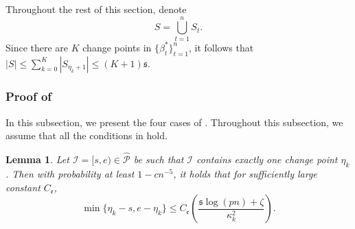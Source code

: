 \documentclass[11pt]{article}
\newcommand{\I}{{\mathcal I }}
\newcommand{\s}{ { \mathfrak{s}  } }
\theoremstyle{plain}
\newtheorem{lemma}[theorem]{Lemma}
\theoremstyle{definition}
\begin{document}
Throughout the rest of this section, denote 
$$S  = \bigcup_{t=1}^n S_t . $$
Since there are $K$ change points in $\{\beta_t^*\}_{t=1}^n$, it follows that $| S| \le \sum_{k=0}^K | S_{\eta_k+1}|\le (K+1) \s $. 


\subsubsection[]{Proof of }
In this subsection, we present the four cases of 
. Throughout this  subsection, we assume that all the conditions in  hold.

 \begin{lemma}
 Let   $ \I=[s,e) \in \mathcal {\widehat P}  $  be such that $\I$ contains exactly  one    change point $ \eta_k $. 
 Then  with probability  at least $1- cn^{-5}$,   it holds that  for sufficiently large constant $ C_{\mathfrak e} $, 
 $$\min\{ \eta_k -s ,e-\eta_k \}  \leq  C_{\mathfrak e}  \left(\frac{ \s \log(pn)  + \zeta }{\kappa_k^2}\right)  .$$
  \end{lemma}
\end{document}
